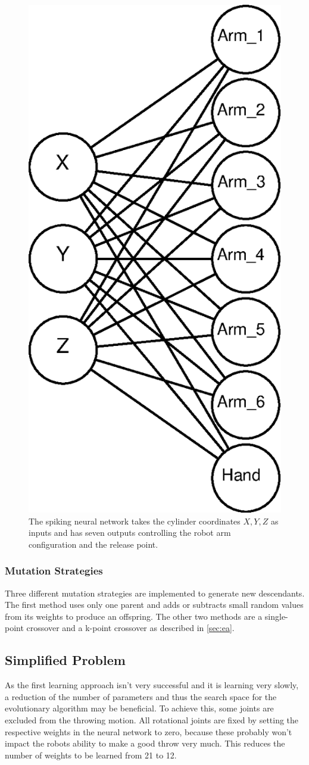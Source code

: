 \begin{figure}[h]
\centering
\includegraphics[width=.5\columnwidth]{figures/net.eps}
\caption{The spiking neural network takes the cylinder coordinates $X, Y, Z$ as inputs and has seven outputs controlling the robot arm configuration and the release point.}
\label{fig:network}
\end{figure}

\subsubsection{Mutation Strategies}
Three different mutation strategies are implemented to generate new descendants.
The first method uses only one parent and adds or subtracts small random values from its weights to produce an offspring.
The other two methods are a single-point crossover and a k-point crossover as described in \autoref{sec:ea}.

\subsection{Simplified Problem}
As the first learning approach isn't very successful and it is learning very slowly, a reduction of the number of parameters and thus the search space for the evolutionary algorithm may be beneficial.
To achieve this, some joints are excluded from the throwing motion.
All rotational joints are fixed by setting the respective weights in the neural network to zero, because these probably won't impact the robots ability to make a good throw very much.
This reduces the number of weights to be learned from 21 to 12.